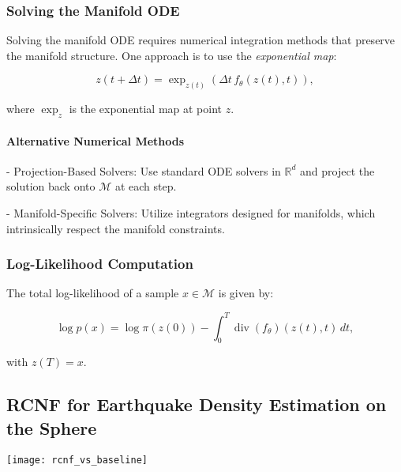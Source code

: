 \documentclass[a4paper,14pt]{article}
\theoremstyle{plain} %
\theoremstyle{definition} %
\theoremstyle{remark} %
\begin{document}
	\subsubsection{Solving the Manifold ODE}
	
	Solving the manifold ODE requires numerical integration methods that preserve the manifold structure. One approach is to use the \textit{exponential map}:
	
	\begin{equation}
		z(t + \Delta t) = \exp_{z(t)} \left( \Delta t \, f_\theta(z(t), t) \right),
	\end{equation}
	
	where \(\exp_{z}\) is the exponential map at point \(z\).
	
	
	\paragraph{Alternative Numerical Methods}
	
	- Projection-Based Solvers: Use standard ODE solvers in \(\mathbb{R}^d\) and project the solution back onto \(\mathcal{M}\) at each step.
	
	- Manifold-Specific Solvers: Utilize integrators designed for manifolds, which intrinsically respect the manifold constraints.
	
	\subsubsection{Log-Likelihood Computation}
	
	The total log-likelihood of a sample \(x \in \mathcal{M}\) is given by:
	
	\begin{equation}
		\log p(x) = \log \pi(z(0)) - \int_0^T \operatorname{div}(f_\theta)(z(t), t) \, dt,
	\end{equation}
	
	with \(z(T) = x\).
		
	\subsection{RCNF for Earthquake Density Estimation on the Sphere}
	
	\texttt{[image: rcnf\_vs\_baseline]}
	
\end{document}
